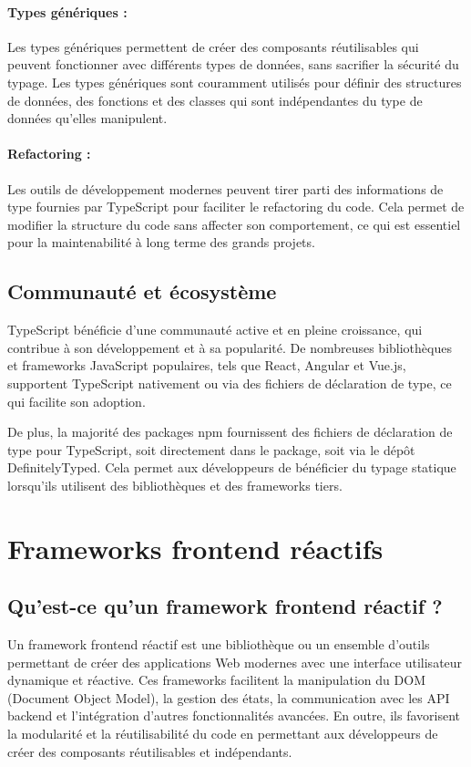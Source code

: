 \paragraph{Types génériques :} Les types génériques permettent de créer des composants réutilisables qui peuvent fonctionner avec différents types de données, sans sacrifier la sécurité du typage. Les types génériques sont couramment utilisés pour définir des structures de données, des fonctions et des classes qui sont indépendantes du type de données qu'elles manipulent.
\paragraph{Refactoring :} Les outils de développement modernes peuvent tirer parti des informations de type fournies par TypeScript pour faciliter le refactoring du code. Cela permet de modifier la structure du code sans affecter son comportement, ce qui est essentiel pour la maintenabilité à long terme des grands projets.

\subsection{Communauté et écosystème}

TypeScript bénéficie d'une communauté active et en pleine croissance, qui contribue à son développement et à sa popularité. De nombreuses bibliothèques et frameworks JavaScript populaires, tels que React, Angular et Vue.js, supportent TypeScript nativement ou via des fichiers de déclaration de type, ce qui facilite son adoption.

De plus, la majorité des packages npm fournissent des fichiers de déclaration de type pour TypeScript, soit directement dans le package, soit via le dépôt DefinitelyTyped. Cela permet aux développeurs de bénéficier du typage statique lorsqu'ils utilisent des bibliothèques et des frameworks tiers.

\section{Frameworks frontend réactifs}

\subsection{Qu'est-ce qu'un framework frontend réactif ?}

Un framework frontend réactif est une bibliothèque ou un ensemble d'outils permettant de créer des applications Web modernes avec une interface utilisateur dynamique et réactive. Ces frameworks facilitent la manipulation du DOM (Document Object Model), la gestion des états, la communication avec les API backend et l'intégration d'autres fonctionnalités avancées. En outre, ils favorisent la modularité et la réutilisabilité du code en permettant aux développeurs de créer des composants réutilisables et indépendants.


